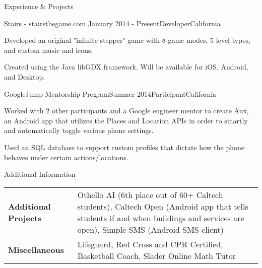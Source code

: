\documentclass{resume} %
\begin{document}
\begin{rSection}{Experience \& Projects}

\begin{rSubsection}{Stairs - stairsthegame.com }{January 2014 - Present}{Developer}{California}
\item Developed an original "infinite stepper" game with 8 game modes,
    5 level types, and custom music and icons.
\item Created using the Java libGDX framework. Will be available for iOS, Android,
    and Desktop.
\end{rSubsection}


\begin{rSubsection}{GoogleJump Mentorship Program}{Summer 2014}{Participant}{California}
\item Worked with 2 other participants and a Google engineer mentor to create Aux,
    an Android app that utilizes the Places and Location APIs in order to smartly
    and automatically toggle various phone settings.
\item Used an SQL database to support custom profiles that dictate how the phone behaves
    under certain actions/locations.
\end{rSubsection}

\end{rSection}




\begin{rSection}{Additional Information}

\noindent\begin{tabularx}{.98\textwidth}{@{}lX}
    \bfseries{Additional Projects}   &  Othello AI (6th place out of 60+ Caltech
    students), Caltech Open (Android app that tells students if and when
    buildings and services are open), Simple SMS (Android SMS client) \\
    \bfseries{Miscellaneous}   &  Lifeguard, Red Cross and CPR Certified, Basketball
    Coach, Slader Online Math Tutor \\
\end{tabularx}

\end{rSection}
\end{document}
